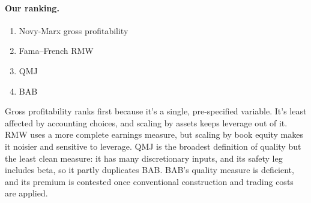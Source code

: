 \paragraph{Our ranking.}
\begin{enumerate}\setlength{\itemsep}{1pt}
  \item Novy-Marx gross profitability
  \item Fama--French RMW
  \item QMJ
  \item BAB
\end{enumerate}
Gross profitability ranks first because it's a single, pre-specified variable. It's least affected by accounting choices, and scaling by assets keeps leverage out of it. RMW uses a more complete earnings measure, but scaling by book equity makes it noisier and sensitive to leverage. QMJ is the broadest definition of quality but the least clean measure: it has many discretionary inputs, and its safety leg includes beta, so it partly duplicates BAB. BAB's quality measure is deficient, and its premium is contested once conventional construction and trading costs are applied.
